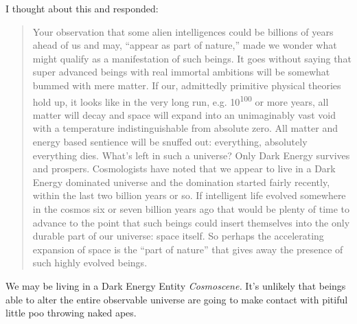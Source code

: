 \noindent I thought about this and responded:

\begin{quote}
Your observation that some alien intelligences could be billions of
years ahead of us and may, ``appear as part of nature,'' made we wonder
what might qualify as a manifestation of such beings. It goes without
saying that super advanced beings with real immortal ambitions will be
somewhat bummed with mere matter. If our, admittedly primitive physical
theories hold up, it looks like in the very long run, e.g.
10\textsuperscript{100} or more years, all matter will decay and space
will expand into an unimaginably vast void with a temperature
indistinguishable from absolute zero. All matter and energy based
sentience will be snuffed out: everything, absolutely everything dies.
What's left in such a universe? Only Dark Energy survives and prospers.
Cosmologists have noted that we appear to live in a Dark Energy dominated
universe and the domination started fairly recently, within the last two
billion years or so. If intelligent life evolved somewhere in the cosmos
six or seven billion years ago that would be plenty of time to advance
to the point that such beings could insert themselves into the only
durable part of our universe: space itself. So perhaps the accelerating
expansion of space is the ``part of nature'' that gives away the
presence of such highly evolved beings.
\end{quote}

We may be living in a Dark Energy Entity \emph{Cosmoscene.} It's
unlikely that beings able to alter the entire observable universe are
going to make contact with pitiful little poo throwing naked apes.



%